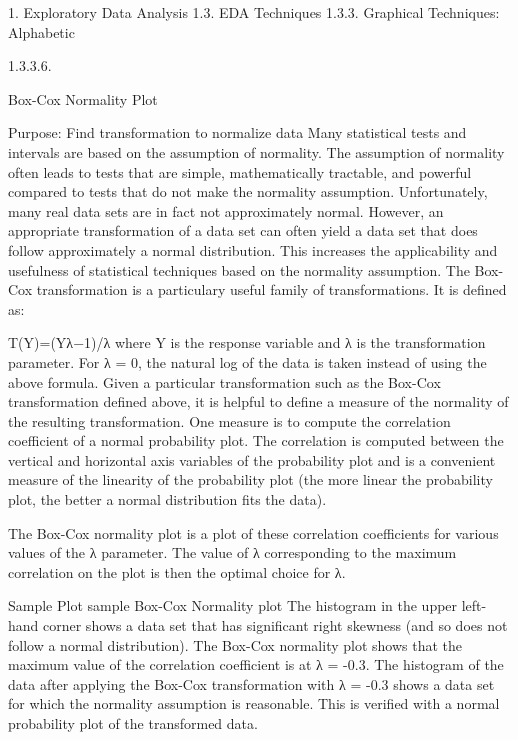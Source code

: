 
1. Exploratory Data Analysis 
1.3. EDA Techniques 
1.3.3. Graphical Techniques: Alphabetic 

1.3.3.6.

Box-Cox Normality Plot

Purpose: 
Find transformation to normalize data	Many statistical tests and intervals are based on the assumption of normality. The assumption of normality often leads to tests that are simple, mathematically tractable, and powerful compared to tests that do not make the normality assumption. Unfortunately, many real data sets are in fact not approximately normal. However, an appropriate transformation of a data set can often yield a data set that does follow approximately a normal distribution. This increases the applicability and usefulness of statistical techniques based on the normality assumption.
The Box-Cox transformation is a particulary useful family of transformations. It is defined as:

T(Y)=(Yλ−1)/λ
where Y is the response variable and λ is the transformation parameter. For λ = 0, the natural log of the data is taken instead of using the above formula.
Given a particular transformation such as the Box-Cox transformation defined above, it is helpful to define a measure of the normality of the resulting transformation. One measure is to compute the correlation coefficient of a normal probability plot. The correlation is computed between the vertical and horizontal axis variables of the probability plot and is a convenient measure of the linearity of the probability plot (the more linear the probability plot, the better a normal distribution fits the data).

The Box-Cox normality plot is a plot of these correlation coefficients for various values of the λ parameter. The value of λ corresponding to the maximum correlation on the plot is then the optimal choice for λ.

Sample Plot	sample Box-Cox Normality plot
The histogram in the upper left-hand corner shows a data set that has significant right skewness (and so does not follow a normal distribution). The Box-Cox normality plot shows that the maximum value of the correlation coefficient is at λ = -0.3. The histogram of the data after applying the Box-Cox transformation with λ = -0.3 shows a data set for which the normality assumption is reasonable. This is verified with a normal probability plot of the transformed data.

